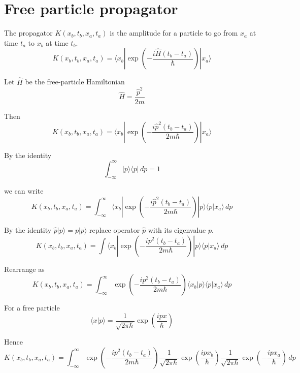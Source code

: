 

\section*{Free particle propagator}

The propagator $K(x_b,t_b,x_a,t_a)$ is the amplitude for a particle to go from $x_a$
at time $t_a$ to $x_b$ at time $t_b$.
\begin{equation*}
K(x_b,t_b,x_a,t_a)=\langle x_b|\exp\left(-\frac{i\hat H(t_b-t_a)}{\hbar}\right)|x_a\rangle
\end{equation*}

Let $\hat H$ be the free-particle Hamiltonian
\begin{equation*}
\hat H=\frac{\hat p^2}{2m}
\end{equation*}

Then
\begin{equation*}
K(x_b,t_b,x_a,t_a)=\langle x_b|\exp\left(-\frac{i\hat p^2(t_b-t_a)}{2m\hbar}\right)|x_a\rangle
\end{equation*}

By the identity
\begin{equation*}
\int_{-\infty}^\infty|p\rangle\langle p|\,dp=1
\end{equation*}

we can write
\begin{equation*}
K(x_b,t_b,x_a,t_a)=\int_{-\infty}^\infty
\langle x_b|\exp\left(-\frac{i\hat p^2(t_b-t_a)}{2m\hbar}\right)|p\rangle\langle p|x_a\rangle\,dp
\end{equation*}

By the identity $\hat p|p\rangle=p|p\rangle$ replace operator $\hat p$ with its eigenvalue $p$.
\begin{equation*}
K(x_b,t_b,x_a,t_a)=\int\langle x_b|\exp\left(-\frac{ip^2(t_b-t_a)}{2m\hbar}\right)|p\rangle\langle p|x_a\rangle\,dp
\end{equation*}

Rearrange as
\begin{equation*}
K(x_b,t_b,x_a,t_a)=\int_{-\infty}^\infty
\exp\left(-\frac{ip^2(t_b-t_a)}{2m\hbar}\right)\langle x_b|p\rangle\langle p|x_a\rangle\,dp
\end{equation*}

For a free particle
\begin{equation*}
\langle x|p\rangle=\frac{1}{\sqrt{2\pi\hbar}}\exp\left(\frac{ipx}{\hbar}\right)
\end{equation*}

Hence
\begin{equation*}
K(x_b,t_b,x_a,t_a)=\int_{-\infty}^\infty
\exp\left(-\frac{ip^2(t_b-t_a)}{2m\hbar}\right)
\frac{1}{\sqrt{2\pi\hbar}}\exp\left(\frac{ipx_b}{\hbar}\right)
\frac{1}{\sqrt{2\pi\hbar}}\exp\left(-\frac{ipx_a}{\hbar}\right)\,dp
\end{equation*}

